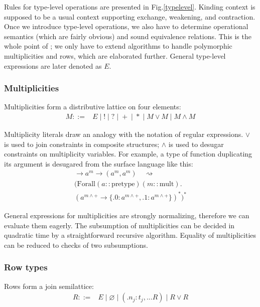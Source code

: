 \documentclass[conference]{IEEEtran}
\begin{document}
Rules for type-level operations are presented in Fig.\ref{typelevel}. Kinding
context is supposed to be a usual context supporting exchange, weakening, and
contraction. Once we introduce type-level operations, we also have to determine
operational semantics (which are fairly obvious) and sound equivalence
relations. This is the whole point of \cite{stone}; we only have to extend
algorithms to handle polymorphic multiplicities and rows, which are elaborated
further. General type-level expressions are later denoted as $E$.

\subsubsection{Multiplicities}

Multiplicities form a distributive lattice on four elements:
\[
    \begin{array}{rl}
        M ::=& E \;|\; ! \;|\; ? \;|\; + \;|\; * \;|\; M \lor M
            \;|\; M \land M
    \end{array}
\]

Multiplicity literals draw an analogy with the notation of regular expressions.
$\lor$ is used to join constraints in composite structures; $\land$ is used to
desugar constraints on multiplicity variables. For example, a type of function
duplicating its argument is desugared from the surface language like this:
\begin{multline}
    [m \le +] \to a^m \to (a^m, a^m) \quad\rightsquigarrow\\
    \big(\text{Forall} (a :: \text{pretype}) (m :: \text{mult}) .\\
    (a^{m \land +} \to \{.0: a^{m \land +}, .1: a^{m \land +}\})^*\big)^*
\end{multline}

General expressions for multiplicities are strongly normalizing, therefore we
can evaluate them eagerly. The subsumption of multiplicities can be decided in
quadratic time by a straightforward recursive algorithm. Equality of
multiplicities can be reduced to checks of two subsumptions.

\subsubsection{Row types}

Rows form a join semilattice:
\[
    \begin{array}{rl}
        R ::=& E \;|\; \varnothing \;|\; (.n_j : t_j, ... R)
            \;|\; R \lor R
    \end{array}
\]
\end{document}
